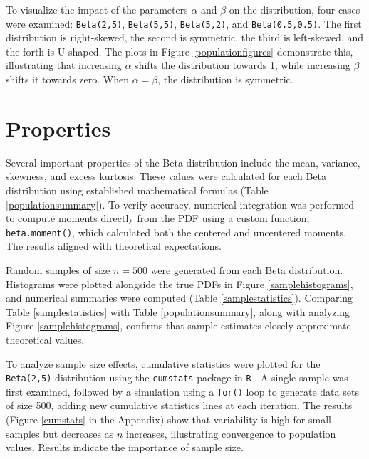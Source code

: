 \documentclass{article}\usepackage[]{graphicx}\usepackage[]{xcolor}
\begin{document}
\begin{multicols}{2}
To visualize the impact of the parameters $\alpha$ and $\beta$ on the distribution, four cases were examined: \texttt{Beta(2,5)}, \texttt{Beta(5,5)}, \texttt{Beta(5,2)}, and \texttt{Beta(0.5,0.5)}. The first distribution is right-skewed, the second is symmetric, the third is left-skewed, and the forth is U-shaped. The plots in Figure \ref{populationfigures} demonstrate this, illustrating that increasing $\alpha$ shifts the distribution towards 1, while increasing $\beta$ shifts it towards zero. When $\alpha= \beta$, the distribution is symmetric.

\section{Properties}
Several important properties of the Beta distribution include the mean, variance, skewness, and excess kurtosis. These values were calculated for each Beta distribution using established mathematical formulas (Table \ref{populationsummary}). To verify accuracy, numerical integration was performed to compute moments directly from the PDF using a custom function, \texttt{beta.moment()}, which calculated both the centered and uncentered moments. The results aligned with theoretical expectations.

Random samples of size $n=500$ were generated from each Beta distribution. Histograms were plotted alongside the true PDFs in Figure \ref{samplehistograms}, and numerical summaries were computed (Table \ref{samplestatistics}). Comparing Table \ref{samplestatistics} with Table \ref{populationsummary}, along with analyzing Figure \ref{samplehistograms}, confirms that sample estimates closely approximate theoretical values.

To analyze sample size effects, cumulative statistics were plotted for the \texttt{Beta(2,5)} distribution using the \texttt{cumstats} package in \texttt{R} \citep{cumstats}. A single sample was first examined, followed by a simulation using a \texttt{for()} loop to generate data sets of size 500, adding new cumulative statistics lines at each iteration. The results (Figure \ref{cumstats} in the Appendix) show that variability is high for small samples but decreases as $n$ increases, illustrating convergence to population values. Results indicate the importance of sample size.




\end{multicols}
\end{document}
